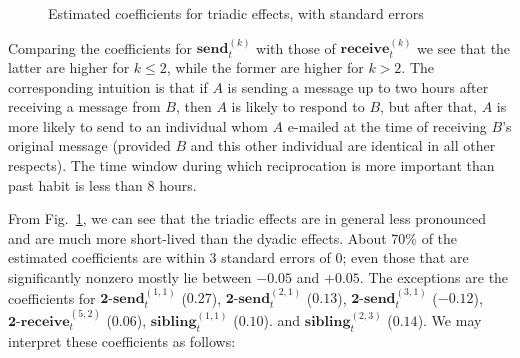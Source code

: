 \documentclass[final]{statsoc}
\begin{document}
\begin{figure}
  \centering
  \caption{Estimated coefficients for triadic effects, with standard errors}
  \label{F:enron-triad}
\end{figure}

Comparing the coefficients for $\textbf{send}_t^{(k)}$ with those of
$\textbf{receive}_t^{(k)}$ we see that the latter are higher for $k \leq 2$,
while the former are higher for $k > 2$.  The corresponding intuition is that if $A$ is
sending a message up to two hours after receiving a message from $B$, then $A$
is likely to respond to $B$, but after that, $A$ is more likely to send to an individual
whom $A$ e-mailed at the time of receiving $B$'s original message (provided
$B$ and this other individual are identical in all other respects).  The time window
during which reciprocation is more important than past habit is less than 8 hours.

From Fig.~\ref{F:enron-triad}, we can see that the triadic effects are in general less
pronounced and are much more short-lived than the dyadic effects.  About
70\% of the estimated coefficients are within $3$ standard errors of
$0$; even those that are significantly nonzero mostly lie between $-0.05$ and
$+0.05$.  The exceptions are the coefficients for
$\textbf{2-send}_t^{(1,1)}$ ($0.27$),
$\textbf{2-send}_t^{(2,1)}$ ($0.13$),
$\textbf{2-send}_t^{(3,1)}$ ($-0.12$),
$\textbf{2-receive}_t^{(5,2)}$ ($0.06$),
$\textbf{sibling}_t^{(1,1)}$ ($0.10$).
and
$\textbf{sibling}_t^{(2,3)}$ ($0.14$).  We may interpret these coefficients as follows:
\end{document}
